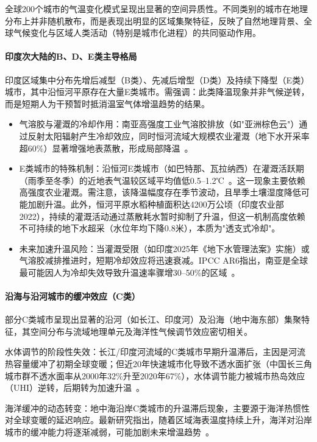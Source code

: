 \documentclass[a4paper,UTF8,scheme=chinese,zihao=-4,twoside]{ctexart}
\makeatletter
\newcommand{\初号}{\zihao{0}}
\newcommand{\小初}{\zihao{-0}}
\newcommand{\一号}{\zihao{1}}
\newcommand{\小一}{\zihao{-1}}
\newcommand{\二号}{\zihao{2}}
\newcommand{\小二}{\zihao{-2}}
\newcommand{\三号}{\zihao{3}}
\newcommand{\小三}{\zihao{-3}}
\newcommand{\四号}{\zihao{4}}
\newcommand{\小四}{\zihao{-4}}
\newcommand{\五号}{\zihao{5}}
\newcommand{\小五}{\zihao{-5}}
\newcommand{\六号}{\zihao{6}}
\newcommand{\小六}{\zihao{-6}}
\newcommand{\七号}{\zihao{7}}
\newcommand{\八号}{\zihao{8}}
\newcommand{\宋体}{\songti}
\newcommand{\黑体}{\heiti}
\newcommand{\仿宋}{\fangsong}
\newcommand{\楷书}{\kaishu}
\newcommand{\粗体}{\bfseries}
\newcommand{\斜体}{\itshape}
\newcommand\下划线[2][6em]{\hskip1pt\underline{\hb@xt@ #1{\hss#2\hss}}\hskip3pt}
\makeatother
\begin{document}
全球200个城市的气温变化模式呈现出显著的空间异质性。不同类别的城市在地理分布上并非随机散布，而是表现出明显的区域集聚特征，反映了自然地理背景、全球气候变化与区域人类活动（特别是城市化进程）的共同驱动作用。

\paragraph{印度次大陆的B、D、E类主导格局}

印度区域集中分布先增后减型（B类）、先减后增型（D类）及持续下降型（E类）城市，其中沿恒河平原存在大量E类城市。需强调：此类降温现象并非气候逆转，而是短期人为干预暂时抵消温室气体增温趋势的结果。

\begin{itemize}
    \item 气溶胶与灌溉的冷却作用：南亚高强度工业气溶胶排放（如"亚洲棕色云"）通过反射太阳辐射产生冷却效应，同时恒河流域大规模农业灌溉（地下水开采率超60\%）显著增强地表蒸散，形成局部降温~\cite{li2022}。
    \item E类城市的特殊机制：沿恒河E类城市（如巴特那、瓦拉纳西）在灌溉活跃期（雨季至冬季）的近地表气温较区域平均值低0.5–1.2℃~\cite{mishra2023}。这一现象主要依赖高强度农业灌溉。需注意，该降温幅度存在季节波动，且旱季土壤湿度降低可能加剧升温。此外，恒河平原水稻种植面积达4200万公顷（印度农业部2022），持续的灌溉活动通过蒸散耗水暂时抑制了升温，但这一机制高度依赖不可持续的地下水超采（水位年均下降0.8米），本质为"透支式冷却"。
    \item 未来加速升温风险：当灌溉受限（如印度2025年《地下水管理法案》实施）或气溶胶减排推进时，短期冷却效应将迅速衰减。IPCC AR6指出，南亚是全球最可能因人为冷却失效导致升温速率骤增30–50\%的区域~\cite{ipcc2021ch12}。
\end{itemize}

\paragraph{沿海与沿河城市的缓冲效应（C类）}

部分C类城市呈现出显著的沿河（如长江、印度河）及沿海（地中海东部）集聚特征，其空间分布与流域地理单元及海洋性气候调节效应密切相关。

水体调节的阶段性失效：长江/印度河流域的C类城市早期升温滞后，主因是河流热容量缓冲了初期全球变暖；但近20年快速城市化导致不透水面扩张（中国长三角城市群不透水面率从2000年32\%升至2020年67\%），水体调节能力被城市热岛效应（UHI）逆转，后期转为加速升温~\cite{peng2021}。

海洋缓冲的动态转变：地中海沿岸C类城市的升温滞后现象，主要源于海洋热惯性对全球变暖的延迟响应。最新研究指出，随着区域海表温度持续上升，海洋对沿岸城市的缓冲能力将逐渐减弱，可能加剧未来增温趋势~\cite{mariotti2022}。
\end{document}
